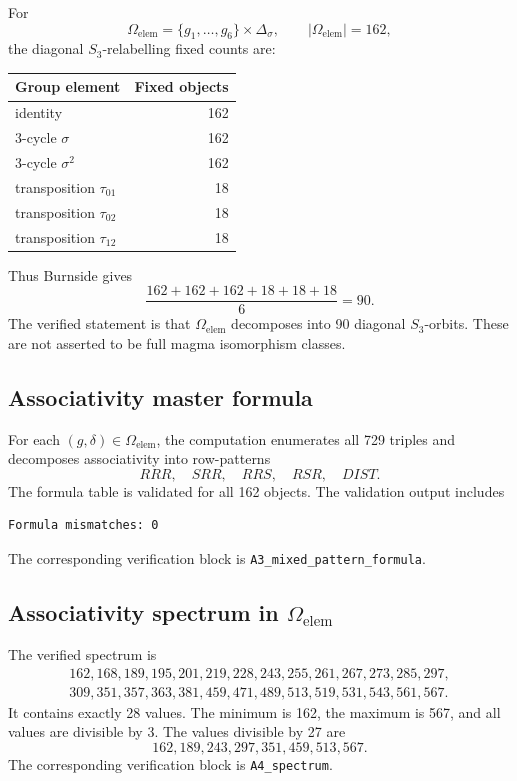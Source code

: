 \documentclass[11pt]{article}
\begin{document}
For
\[
\Omega_{\mathrm{elem}}=\{g_1,\ldots,g_6\}\times\Delta_\sigma,
\qquad |\Omega_{\mathrm{elem}}|=162,
\]
the diagonal \(S_3\)-relabelling fixed counts are:

\begin{center}
\small
\begin{tabular}{@{}lr@{}}
\toprule
Group element & Fixed objects \\
\midrule
identity & 162 \\
3-cycle \(\sigma\) & 162 \\
3-cycle \(\sigma^2\) & 162 \\
transposition \(\tau_{01}\) & 18 \\
transposition \(\tau_{02}\) & 18 \\
transposition \(\tau_{12}\) & 18 \\
\bottomrule
\end{tabular}
\end{center}

Thus Burnside gives
\[
\frac{162+162+162+18+18+18}{6}=90.
\]
The verified statement is that \(\Omega_{\mathrm{elem}}\) decomposes into 90
diagonal \(S_3\)-orbits. These are not asserted to be full magma isomorphism
classes.

\subsection{Associativity master formula}

For each \((g,\delta)\in\Omega_{\mathrm{elem}}\), the computation enumerates all
729 triples and decomposes associativity into row-patterns
\[
RRR,\quad SRR,\quad RRS,\quad RSR,\quad DIST.
\]
The formula table is validated for all 162 objects. The validation output includes
\begin{verbatim}
Formula mismatches: 0
\end{verbatim}
The corresponding verification block is \texttt{A3\_mixed\_pattern\_formula}.

\subsection{Associativity spectrum in \texorpdfstring{\(\Omega_{\mathrm{elem}}\)}{Omega-elem}}

The verified spectrum is
\[
\begin{gathered}
162,168,189,195,201,219,228,243,255,261,267,273,285,297,\\
309,351,357,363,381,459,471,489,513,519,531,543,561,567.
\end{gathered}
\]
It contains exactly 28 values. The minimum is 162, the maximum is 567, and all
values are divisible by 3. The values divisible by 27 are
\[
162,189,243,297,351,459,513,567.
\]
The corresponding verification block is \texttt{A4\_spectrum}.
\end{document}
